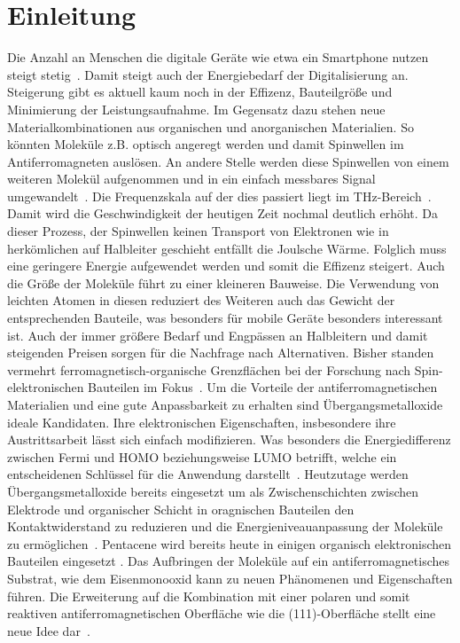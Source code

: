 \chapter{Einleitung}
    Die Anzahl an Menschen die digitale Geräte wie etwa ein Smartphone nutzen steigt stetig~\cite{Statista}.
    Damit steigt auch der Energiebedarf der Digitalisierung an.
    Steigerung gibt es aktuell kaum noch in der Effizenz, Bauteilgröße und Minimierung der Leistungsaufnahme.
    Im Gegensatz dazu stehen neue Materialkombinationen aus organischen und anorganischen Materialien.
    So könnten Moleküle z.B. optisch angeregt werden und damit Spinwellen im Antiferromagneten auslösen. 
    An andere Stelle werden diese Spinwellen von einem weiteren Molekül aufgenommen und in ein einfach messbares Signal umgewandelt~\cite{SINFONIA}.
    Die Frequenzskala auf der dies passiert liegt im \si{\tera\hertz}-Bereich~\cite{bossini_macrospin_2016}.
    Damit wird die Geschwindigkeit der heutigen Zeit nochmal deutlich erhöht.
    Da dieser Prozess, der Spinwellen keinen Transport von Elektronen wie in herkömlichen auf Halbleiter geschieht entfällt die Joulsche Wärme.
    Folglich muss eine geringere Energie aufgewendet werden und somit die Effizenz steigert.
    Auch die Größe der Moleküle führt zu einer kleineren Bauweise.
    Die Verwendung von leichten Atomen in diesen reduziert des Weiteren auch das Gewicht der entsprechenden Bauteile, was besonders für mobile Geräte besonders interessant ist.
    Auch der immer größere Bedarf und Engpässen an Halbleitern \cite{Idealo} und damit steigenden Preisen sorgen für die Nachfrage nach Alternativen.
    Bisher standen vermehrt ferromagnetisch-organische Grenzflächen bei der Forschung nach Spin-elektronischen Bauteilen im Fokus~\cite{ma-DJ}.
    Um die Vorteile der antiferromagnetischen Materialien und eine gute Anpassbarkeit zu erhalten sind Übergangsmetalloxide ideale Kandidaten.
    Ihre elektronischen Eigenschaften, insbesondere ihre Austrittsarbeit lässt sich einfach modifizieren.
    Was besonders die Energiedifferenz zwischen Fermi und HOMO beziehungsweise LUMO betrifft, welche ein entscheidenen Schlüssel für die Anwendung darstellt~\cite{5A_4}.
    Heutzutage werden Übergangsmetalloxide bereits eingesetzt um als Zwischenschichten zwischen Elektrode und organischer Schicht in oragnischen Bauteilen den Kontaktwiderstand zu reduzieren und die Energieniveauanpassung der Moleküle zu ermöglichen~\cite{IF_11}.
    Pentacene wird bereits heute in einigen organisch elektronischen Bauteilen eingesetzt \cite{5A_4}.
    Das Aufbringen der Moleküle auf ein antiferromagnetisches Substrat, wie dem Eisenmonooxid kann zu neuen Phänomenen und Eigenschaften führen.
    Die Erweiterung auf die Kombination mit einer polaren und somit reaktiven antiferromagnetischen Oberfläche wie die  (111)-Oberfläche stellt eine neue Idee dar~\cite{Cappus et al. - 1993 - Hydroxyl groups on oxide surfaces NiO(100), NiO(1.pdf}.


